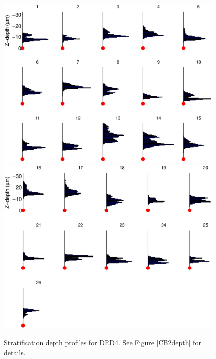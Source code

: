 \documentclass{article}
\begin{document}
\clearpage

\begin{figure}
  \centering
  {\includegraphics[scale=1]{Figures/SupFig2/DRD4-stratification-depth-1}}
  {\includegraphics[scale=1]{Figures/SupFig2/DRD4-stratification-depth-16}}
  \caption{Stratification depth profiles for DRD4. See Figure
    \ref{CB2depth} for details.}
\end{figure}

\clearpage
\end{document}
